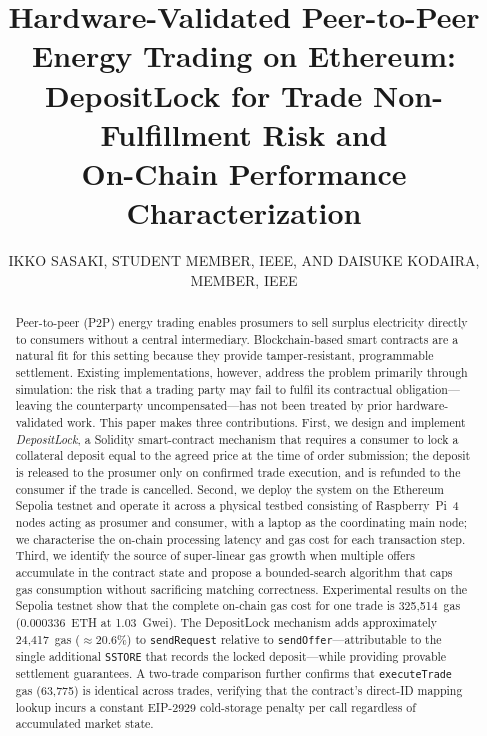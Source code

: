 \documentclass{IEEEoj}
\begin{document}
\title{Hardware-Validated Peer-to-Peer Energy Trading on Ethereum:\\
       DepositLock for Trade Non-Fulfillment Risk and\\
       On-Chain Performance Characterization}

\author{IKKO SASAKI, STUDENT MEMBER, IEEE,
AND DAISUKE KODAIRA, MEMBER, IEEE}

\begin{abstract}
Peer-to-peer (P2P) energy trading enables prosumers to sell surplus
electricity directly to consumers without a central intermediary.
Blockchain-based smart contracts are a natural fit for this setting because
they provide tamper-resistant, programmable settlement.
Existing implementations, however, address the problem primarily through
simulation: the risk that a trading party may fail to fulfil its contractual
obligation---leaving the counterparty uncompensated---has not been treated by
prior hardware-validated work.
This paper makes three contributions.
First, we design and implement \emph{DepositLock}, a Solidity smart-contract
mechanism that requires a consumer to lock a collateral deposit equal to the
agreed price at the time of order submission; the deposit is released to the
prosumer only on confirmed trade execution, and is refunded to the consumer
if the trade is cancelled.
Second, we deploy the system on the Ethereum Sepolia testnet and operate it
across a physical testbed consisting of Raspberry~Pi~4 nodes acting as
prosumer and consumer, with a laptop as the coordinating main node; we
characterise the on-chain processing latency and gas cost for each
transaction step.
Third, we identify the source of super-linear gas growth when multiple offers
accumulate in the contract state and propose a bounded-search algorithm that
caps gas consumption without sacrificing matching correctness.
Experimental results on the Sepolia testnet show that the complete
on-chain gas cost for one trade is 325,514~gas (0.000336~ETH at 1.03~Gwei).
The DepositLock mechanism adds approximately 24,417~gas ($\approx$20.6\%)
to \texttt{sendRequest} relative to \texttt{sendOffer}---attributable to
the single additional \texttt{SSTORE} that records the locked deposit---while
providing provable settlement guarantees.
A two-trade comparison further confirms that \texttt{executeTrade} gas
(63,775) is identical across trades, verifying that the contract's
direct-ID mapping lookup incurs a constant EIP-2929 cold-storage penalty
per call regardless of accumulated market state.
\end{abstract}
\end{document}
